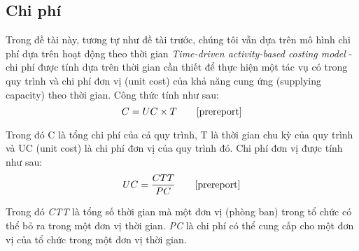 \subsection{Chi phí}
Trong đề tài này, tương tự như đề tài trước, chúng tôi vẫn dựa trên mô hình chi phí dựa trên hoạt động theo thời gian \emph{Time-driven activity-based costing
model} - chi phí được tính dựa trên thời gian cần thiết để thực hiện một tác vụ có trong quy trình và chi phí đơn vị (unit cost) của khả năng cung ứng (supplying capacity) theo thời gian. Công thức tính như sau:
\[ C = UC \times T \tag*{\cite{prereport}}\]
\par
Trong đó C là tổng chi phí của cả quy trình, T là thời gian chu kỳ của quy trình và UC (unit cost) là chi phí đơn vị của quy trình đó. Chi phí đơn vị được tính như sau:
\[ UC = \frac{CTT}{PC} \tag*{\cite{prereport}}\]
\par
Trong đó \emph{CTT} là tổng số thời gian mà một đơn vị (phòng ban) trong tổ chức có thể bỏ ra trong một đơn vị thời gian. \emph{PC} là chi phí có thể cung cấp cho một đơn vị của tổ chức trong một đơn vị thời gian.